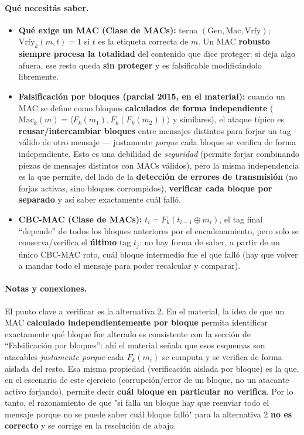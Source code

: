 \paragraph{Qué necesitás saber.}
\begin{itemize}
  \item \textbf{Qué exige un MAC (Clase de MACs):} terna $(\mathrm{Gen},\mathrm{Mac},
  \mathrm{Vrfy})$; $\mathrm{Vrfy}_k(m,t)=1$ si $t$ es la etiqueta correcta de $m$. Un MAC
  \textbf{robusto siempre procesa la totalidad} del contenido que dice proteger: si deja
  algo afuera, ese resto queda \textbf{sin proteger} y es falsificable modificándolo
  libremente.
  \item \textbf{Falsificación por bloques (parcial 2015, en el material):} cuando un MAC
  se define como bloques \textbf{calculados de forma independiente}
  ($\mathrm{Mac}_k(m)=\langle F_k(m_1), F_k(F_k(m_2))\rangle$ y similares), el ataque
  típico es \textbf{reusar/intercambiar bloques} entre mensajes distintos para forjar un
  tag válido de otro mensaje --- justamente \emph{porque} cada bloque se verifica de
  forma independiente. Esto es una debilidad de \emph{seguridad} (permite forjar
  combinando piezas de mensajes distintos con MACs válidos), pero la misma independencia
  es la que permite, del lado de la \textbf{detección de errores de transmisión}
  (no forjas activas, sino bloques corrompidos), \textbf{verificar cada bloque por
  separado} y así saber exactamente cuál falló.
  \item \textbf{CBC-MAC (Clase de MACs):} $t_i=F_k(t_{i-1}\oplus m_i)$, el tag final
  ``depende'' de todos los bloques anteriores por el encadenamiento, pero solo se
  conserva/verifica el \textbf{último} tag $t_j$: no hay forma de saber, a partir de un
  único CBC-MAC roto, cuál bloque intermedio fue el que falló (hay que volver a mandar
  todo el mensaje para poder recalcular y comparar).
\end{itemize}

\paragraph{Notas y conexiones.}
El punto clave a verificar es la alternativa 2. En el material, la idea de que un MAC
\textbf{calculado independientemente por bloque} permita identificar exactamente qué
bloque fue alterado es consistente con la sección de ``Falsificación por bloques'': ahí
el material señala que esos esquemas son atacables \emph{justamente porque} cada
$F_k(m_i)$ se computa y se verifica de forma aislada del resto. Esa misma propiedad
(verificación aislada por bloque) es la que, en el escenario de este ejercicio
(corrupción/error de un bloque, no un atacante activo forjando), permite decir
\textbf{cuál bloque en particular no verifica}. Por lo tanto, el razonamiento de que
"si falla un bloque hay que reenviar todo el mensaje porque no se puede saber cuál
bloque falló" para la alternativa 2 \textbf{no es correcto} y se corrige en la
resolución de abajo.

